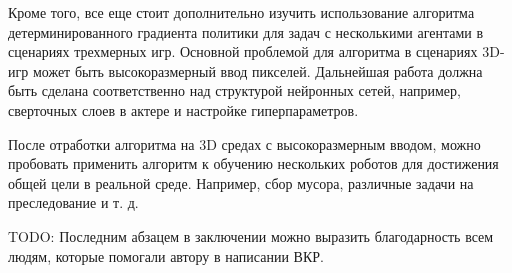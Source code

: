 Кроме того, все еще стоит дополнительно изучить использование алгоритма детерминированного градиента политики для задач с несколькими агентами в сценариях трехмерных игр. Основной проблемой для алгоритма в сценариях 3D-игр может быть высокоразмерный ввод пикселей. Дальнейшая работа должна быть сделана соответственно над структурой нейронных сетей, например, сверточных слоев в актере и настройке гиперпараметров.

После отработки алгоритма на 3D средах с высокоразмерным вводом, можно пробовать применить алгоритм к обучению нескольких роботов для достижения общей цели в реальной среде. Например, сбор мусора, различные задачи на преследование и т. д.

TODO: Последним абзацем в заключении можно выразить благодарность всем людям, которые помогали автору в написании ВКР.